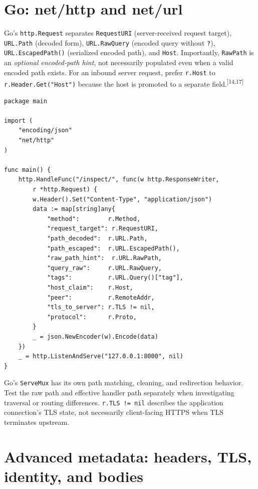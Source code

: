 \documentclass[10pt,letterpaper,oneside]{article}
\newcommand{\refs}[1]{\textsuperscript{\color{blue}[#1]}}
\newcommand{\code}[1]{\texttt{#1}}
\begin{document}
\section{Go: net/http and net/url}
Go's \code{http.Request} separates \code{RequestURI} (server-received request target), \code{URL.Path} (decoded form), \code{URL.RawQuery} (encoded query without \code{?}), \code{URL.EscapedPath()} (serialized encoded path), and \code{Host}. Importantly, \code{RawPath} is an \emph{optional encoded-path hint}, not necessarily populated even when a valid encoded path exists. For an inbound server request, prefer \code{r.Host} to \code{r.Header.Get("Host")} because the host is promoted to a separate field.\refs{14,17}
\begin{lstlisting}[language=GoLang,caption={Go 1.x standard library request-metadata endpoint}]
package main

import (
    "encoding/json"
    "net/http"
)

func main() {
    http.HandleFunc("/inspect/", func(w http.ResponseWriter,
        r *http.Request) {
        w.Header().Set("Content-Type", "application/json")
        data := map[string]any{
            "method":        r.Method,
            "request_target": r.RequestURI,
            "path_decoded":  r.URL.Path,
            "path_escaped":  r.URL.EscapedPath(),
            "raw_path_hint":  r.URL.RawPath,
            "query_raw":     r.URL.RawQuery,
            "tags":          r.URL.Query()["tag"],
            "host_claim":    r.Host,
            "peer":          r.RemoteAddr,
            "tls_to_server": r.TLS != nil,
            "protocol":      r.Proto,
        }
        _ = json.NewEncoder(w).Encode(data)
    })
    _ = http.ListenAndServe("127.0.0.1:8000", nil)
}
\end{lstlisting}
Go's \code{ServeMux} has its own path matching, cleaning, and redirection behavior. Test the raw path and effective handler path separately when investigating traversal or routing differences. \code{r.TLS != nil} describes the application connection's TLS state, not necessarily client-facing HTTPS when TLS terminates upstream.

\section{Advanced metadata: headers, TLS, identity, and bodies}
\end{document}

